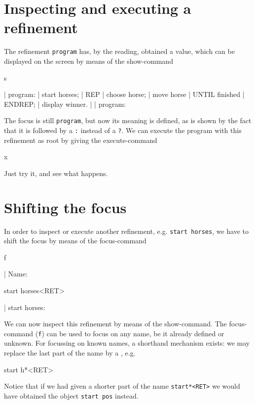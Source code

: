 \section{Inspecting and executing a refinement}

The refinement {\tt program} has, by the reading, obtained a
value, which can be displayed on the screen by means of the show-command

\begin{elan}
        s

|       program:
|         start horses;
|         REP
|           choose horse;
|           move horse
|         UNTIL finished
|         ENDREP;
|         display winner.
|
|       program:\cursor
\end{elan}

\noindent
The focus is still {\tt program}, but now its meaning is defined,
as is shown by the fact that it is followed by a {\tt :} instead of a {\tt ?}.
We can execute the program with this refinement as root
by giving the execute-command

\begin{elan}
        x
\end{elan}

\noindent
Just try it, and see what happens.

\section{Shifting the focus}

In order to inspect or execute another refinement, e.g.
{\tt start horses}, we have to shift the focus by means of the focus-command

\begin{elan}
        f

|       Name:\cursor

        start horses<RET>

|       start horses:\cursor
\end{elan}

\noindent
We can now inspect this refinement by means of the show-command.
The focus-command ({\tt f}) can be used to focus on any name,
be it already defined or unknown.
For focussing on known names, a shorthand mechanism exists: we
may replace the last part of the name by a {\tt *}, e.g.

\begin{elan}
        start h*<RET>
\end{elan}

\noindent
Notice that if we had given a shorter part of the name {\tt start*<RET>}
we would have obtained the object {\tt start pos} instead.


